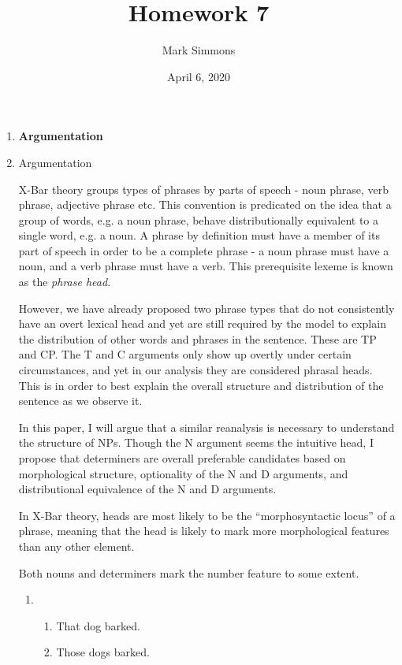 \documentclass[12pt]{article}
\title{Homework 7}
\author{Mark Simmons}
\date{April 6, 2020}
\begin{document}
\maketitle



\begin{enumerate}[label=\textbf{\arabic*.}]
\item \textbf{Argumentation}

\item Argumentation

X-Bar theory groups types of phrases by parts of speech - noun phrase, verb phrase, adjective phrase etc. This convention is predicated on the idea that a group of words, e.g. a noun phrase, behave distributionally equivalent to a single word, e.g. a noun. A phrase by definition must have a member of its part of speech in order to be a complete phrase - a noun phrase must have a noun, and a verb phrase must have a verb. This prerequisite lexeme is known as the \emph{phrase head}.

However, we have already proposed two phrase types that do not consistently have an overt lexical head and yet are still required by the model to explain the distribution of other words and phrases in the sentence. These are TP and CP. The T and C arguments only show up overtly under certain circumstances, and yet in our analysis they are considered phrasal heads. This is in order to best explain the overall structure and distribution of the sentence as we observe it.

In this paper, I will argue that a similar reanalysis is necessary to understand the structure of NPs. Though the N argument seems the intuitive head, I propose that determiners are overall preferable candidates based on morphological structure, optionality of the N and D arguments, and distributional equivalence of the N and D arguments.

In X-Bar theory, heads are most likely to be the ``morphosyntactic locus'' of a phrase, meaning that the head is likely to mark more morphological features than any other element.

Both nouns and determiners mark the number feature to some extent.

\begin{enumerate}[label=(\arabic*)]
\item
\begin{enumerate}[label=\alph*.]
\item That dog barked.
\item Those dogs barked.
\end{enumerate}



\end{enumerate}
\end{enumerate}
\end{document}
